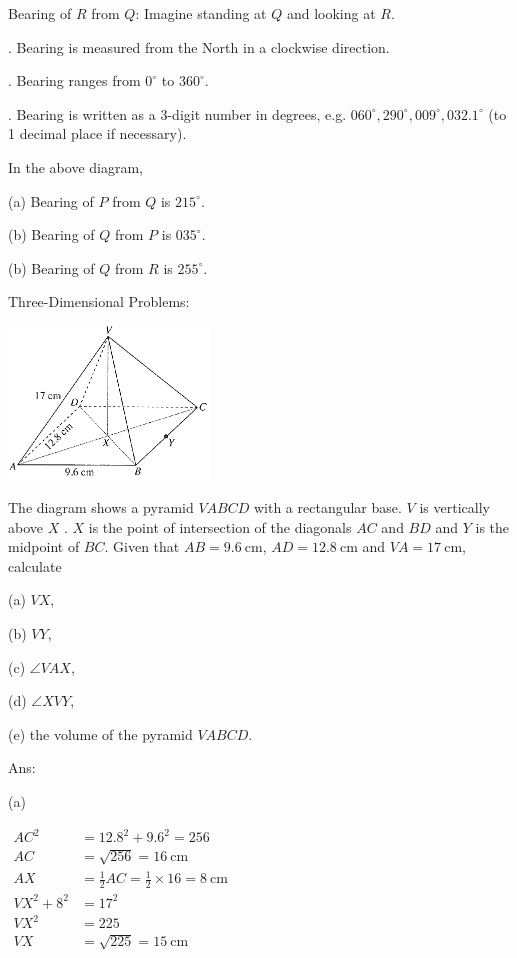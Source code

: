 \documentclass[twocolumn]{article}
\begin{document}
\bigskip

\noindent 
Bearing of $R$ from $Q$: Imagine standing at $Q$ and looking at $R$.

\bigskip

. Bearing is measured from the North in a clockwise direction.

. Bearing ranges from $0^{\circ}$ to $360^{\circ}$.

. Bearing is written as a 3-digit number in degrees, e.g. $060^{\circ}, 290^{\circ}, 009^{\circ}, 032.1^{\circ}$ (to 1 decimal place if necessary).

\bigskip

\noindent 
In the above diagram,

\noindent 
(a) Bearing of $P$ from $Q$ is $215^\circ$.

\noindent 
(b) Bearing of $Q$ from $P$ is $035^\circ$.

\noindent 
(b) Bearing of $Q$ from $R$ is $255^\circ$.

\bigskip

\noindent 
Three-Dimensional Problems:

\includegraphics[width=0.4\textwidth]{109.png}

\noindent
The diagram shows a pyramid $V A B C D$ with a rectangular base. $V$ is vertically above $X$ . $X$ is the point of intersection of the diagonals $A C$ and $B D$ and $Y$ is the midpoint of $B C$. Given that $A B=9.6 \mathrm{~cm}$, $A D=12.8 \mathrm{~cm}$ and $V A=17 \mathrm{~cm}$, calculate

\noindent
(a) $V X$,

\noindent
(b) $V Y$,

\noindent
(c) $\angle V A X$,

\noindent
(d) $\angle X V Y$,

\noindent
(e) the volume of the pyramid $V A B C D$.

\bigskip

\noindent
Ans:

\noindent
(a) 

\noindent
$\begin{aligned} A C^2 & =12.8^2+9.6^2 =256 \\ A C & =\sqrt{256} =16 \mathrm{~cm} \\ A X & =\frac{1}{2} A C =\frac{1}{2} \times 16 =8 \mathrm{~cm} \\ V X^2+8^2 & =17^2 \\ V X^2 & =225 \\ V X & =\sqrt{225} =15 \mathrm{~cm}\end{aligned}$
\end{document}
